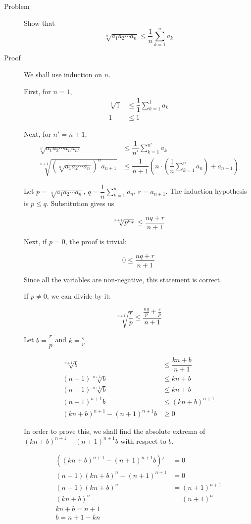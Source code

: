 \begin{description}
\item[Problem] Show that
$$\sqrt[n]{a_1 a_2 \cdots a_n} \le \dfrac 1 n \sum\limits_{k = 1}^n a_k$$

\item[Proof] We shall use induction on $n$.

First, for $n = 1$,
\begin{align*}
\sqrt[1]{1} &\le \dfrac 1 1 \sum\limits_{k = 1}^1 a_k \\
1 &\le 1
\end{align*}

Next, for $n' = n + 1$,
\begin{align*}
\sqrt[n']{a_1 a_2 \cdots a_n a_{n'}} &\le
\dfrac 1 {n'} \sum\limits_{k = 1}^{n'} a_k \\
\sqrt[n+1]{\left(\sqrt[n]{a_1 a_2 \cdots a_n}\right)^n a_{n+1}} &\le
\dfrac 1 {n+1} \left(n \cdot \left(\dfrac 1 n \sum\limits_{k=1}^n a_n\right) +
a_{n+1}\right)
\end{align*}

Let $p = \sqrt[n]{a_1 a_2 \cdots a_n}$, $q = \dfrac 1 n \sum\limits_{k=1}^n
a_n$, $r = a_{n+1}$. The induction hypothesis is $p \le q$. Substitution gives
us

$$\sqrt[n+1]{p^n r} \le \dfrac{nq + r}{n + 1}$$

Next, if $p = 0$, the proof is trivial:

$$0 \le \dfrac{nq + r}{n + 1}$$

Since all the variables are non-negative, this statement is correct.

If $p \ne 0$, we can divide by it:

$$\sqrt[n+1]{\dfrac{r}{p}} \le \dfrac{\frac{nq}{p} + \frac{r}{p}}{n+1}$$

Let $b = \dfrac r p$ and $k = \frac q p$.

\begin{align*}
\sqrt[n+1] b &\le \dfrac{kn + b}{n+1} \\
(n+1) \sqrt[n+1] b &\le kn + b \\
(n+1) \sqrt[n+1] b &\le kn + b \\
(n+1)^{n+1} b &\le (kn + b)^{n+1} \\
(kn + b)^{n+1} - (n+1)^{n+1} b &\ge 0
\end{align*}

In order to prove this, we shall find the absolute extrema of $(kn + b)^{n+1} -
(n+1)^{n+1} b$ with respect to $b$.

\begin{align*}
\left((kn + b)^{n+1} - (n+1)^{n+1} b\right)' &= 0 \\
(n+1) (kn+b)^n - (n+1)^{n+1} &= 0 \\
(n+1) (kn+b)^n &= (n+1)^{n+1} \\
(kn +b)^n &= (n+1)^n \\
kn + b = n + 1 \\
b = n + 1 - kn
\end{align*}


\end{description}
